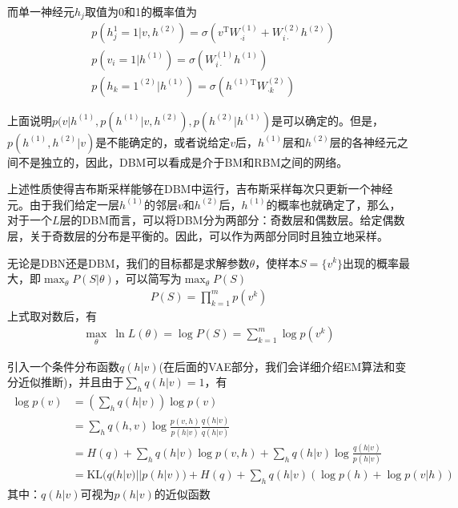         而单一神经元$h_j$取值为0和1的概率值为
        \begin{align*}
        & p \left( h_j^{1}=1|v,h^{(2)} \right)  = \sigma \left( v^\mathrm{T}W_{\cdot i}^{(1)} + W_{i\cdot}^{(2)}h^{(2)} \right) \\
        & p \left( v_i=1|h^{(1)} \right)  = \sigma \left( W_{i\cdot}^{(1)}h^{(1)} \right) \\
        & p \left( h_k=1^{(2)}|h^{(1)} \right) = \sigma \left( h^{(1)}{}^\mathrm{T} W_{\cdot k}^{(2)} \right)
        \end{align*}
        \par
        上面说明$p(v|h^{(1)},p(h^{(1)}|v,h^{(2)}),p(h^{(2)}|h^{(1)})$是可以确定的。但是，$p(h^{(1)},h^{(2)}|v)$是不能确定的，或者说给定$v$后，$h^{(1)}$层和$h^{(2)}$层的各神经元之间不是独立的，因此，DBM可以看成是介于BM和RBM之间的网络。
        \par
        上述性质使得吉布斯采样能够在DBM中运行，吉布斯采样每次只更新一个神经元。由于我们给定一层$h^{(1)}$的邻层$v$和$h^{(2)}$后，$h^{(1)}$的概率也就确定了，那么，对于一个$L$层的DBM而言，可以将DBM分为两部分：奇数层和偶数层。给定偶数层，关于奇数层的分布是平衡的。因此，可以作为两部分同时且独立地采样。
        \par
        无论是DBN还是DBM，我们的目标都是求解参数$\theta$，使样本$S=\{v^k\}$出现的概率最大，即$\max_\theta P(S|\theta)$，可以简写为$\max_\theta P(S)$
        \begin{align*}
        P(S) = \prod_{k=1}^m p(v^k)
        \end{align*}
        上式取对数后，有
        \begin{align*}
        \max_\theta \ \ln L(\theta) = \log P(S) = \sum_{k=1}^m \log p(v^k)
        \end{align*}
        \par
        引入一个条件分布函数$q(h|v)$(在后面的VAE部分，我们会详细介绍EM算法和变分近似推断)，并且由于$\sum_hq(h|v) = 1$，有
        \begin{align*}
        \log p(v) &= \left( \sum_hq(h|v)  \right) \log p(v)\\
        &= \sum_h q(h,v)\log \frac{p(v,h)}{p(h|v)} \frac{q(h|v)}{q(h|v)}\\
        &=H(q) + \sum_hq(h|v) \log p(v,h) + \sum_hq(h|v)\log \frac{q(h|v)}{p(h|v)}\\
        &=\mathrm{KL}\Big(q(h|v)||p(h|v)\Big) + H(q) + \sum_h q(h|v) \left( \log p(h)+ \log p(v|h) \right)
        \end{align*}
        其中：$q(h|v)$可视为$p(h|v)$的近似函数
